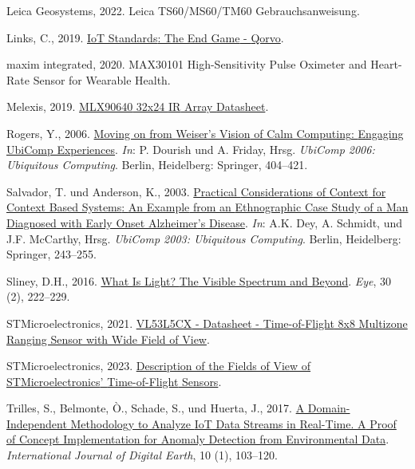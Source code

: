 \documentclass[
  11pt,
  a4paper,
  oneside, openany  ,captions=tableheading
]{scrbook}
\newlength{\cslhangindent}
\newenvironment{CSLReferences}[2] %
  {\begin{list}{}{%
   \setlength{\itemindent}{0pt}
   \setlength{\leftmargin}{0pt}
   \setlength{\parsep}{0pt}
   \ifodd #1
    \setlength{\leftmargin}{\cslhangindent}
    \setlength{\itemindent}{-1\cslhangindent}
   \fi
   \setlength{\itemsep}{#2\baselineskip}}}
  {\end{list}}
\theoremstyle{remark}
\begin{document}
\begin{CSLReferences}{1}{0}
Leica Geosystems, 2022. Leica {TS60}/{MS60}/{TM60 Gebrauchsanweisung}.

Links, C., 2019.
\href{https://www.qorvo.com/design-hub/blog/iot-standards-the-end-game}{{IoT
Standards}: {The End Game} - {Qorvo}}.

maxim integrated, 2020. {MAX30101 High-Sensitivity Pulse Oximeter} and
{Heart-Rate Sensor} for {Wearable Health}.

Melexis, 2019.
\href{https://media.melexis.com/-/media/files/documents/datasheets/mlx90640-datasheet-melexis.pdf}{{MLX90640}
32x24 {IR} Array {Datasheet}}.

Rogers, Y., 2006. \href{https://doi.org/10.1007/11853565_24}{Moving on
from {Weiser}'s {Vision} of {Calm Computing}: {Engaging UbiComp
Experiences}}. \emph{In}: P. Dourish und A. Friday, Hrsg.
\emph{{UbiComp} 2006: {Ubiquitous Computing}}. {Berlin, Heidelberg}:
{Springer}, 404--421.

Salvador, T. und Anderson, K., 2003.
\href{https://doi.org/10.1007/978-3-540-39653-6_19}{Practical
{Considerations} of {Context} for {Context Based Systems}: {An Example}
from an {Ethnographic Case Study} of a {Man Diagnosed} with {Early Onset
Alzheimer}'s {Disease}}. \emph{In}: A.K. Dey, A. Schmidt, und J.F.
McCarthy, Hrsg. \emph{{UbiComp} 2003: {Ubiquitous Computing}}. {Berlin,
Heidelberg}: {Springer}, 243--255.

Sliney, D.H., 2016. \href{https://doi.org/10.1038/eye.2015.252}{What Is
Light? {The} Visible Spectrum and Beyond}. \emph{Eye}, 30 (2), 222--229.

STMicroelectronics, 2021.
\href{https://www.st.com/resource/en/datasheet/vl53l5cx.pdf}{{VL53L5CX}
- {Datasheet} - {Time-of-Flight} 8x8 Multizone Ranging Sensor with Wide
Field of View}.

STMicroelectronics, 2023.
\href{https://www.st.com/resource/en/application/_note/an5894-description-of-the-fields-of-view-of-stmicroelectronics-timeofflight-sensors-stmicroelectronics.pdf}{Description
of the Fields of View of {STMicroelectronics}' {Time-of-Flight}
Sensors}.

Trilles, S., Belmonte, Ò., Schade, S., und Huerta, J., 2017.
\href{https://doi.org/10.1080/17538947.2016.1209583}{A
Domain-Independent Methodology to Analyze {IoT} Data Streams in
Real-Time. {A} Proof of Concept Implementation for Anomaly Detection
from Environmental Data}. \emph{International Journal of Digital Earth},
10 (1), 103--120.


\end{CSLReferences}
\end{document}
